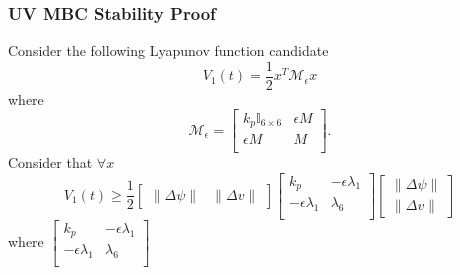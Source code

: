 \subsubsection{\acs{UV} \acs{MBC} Stability Proof}\label{chUV_AMBC.sec.proof_MBC}

Consider the following Lyapunov function candidate
%
\begin{equation} \label{chUV_AMBC.eq.lyap}
V_1(t)=\frac{1}{2} x^T\mathcal{M}_\epsilon x
\end{equation}
%
where 
%
\begin{equation}\label{chUV_AMBC.eq.lyapM}
\mathcal{M}_\epsilon=\left[ 
\begin{array}{cc}
  k_p\mathbb{I}_{6\times 6}  & \epsilon M         \\
  \epsilon M               &    M               \\
\end{array} \right].
\end{equation}
%
Consider that $\forall x$
%
\begin{equation} \label{chUV_AMBC.eq.lyap_bound}
V_1(t)\geq\frac{1}{2}\left[\begin{array}{cc}
   \|\Delta \psi\| & \|\Delta v\|
   \end{array} \right] 
  \left[\begin{array}{cc}
       k_p             & -\epsilon \lambda_1  \\
  -\epsilon \lambda_1  &  \lambda_6           \\
  \end{array} \right] 
\left[\begin{array}{c}
   \|\Delta \psi\| \\ \|\Delta v\|
   \end{array} \right]
\end{equation}
%
%
where 
%
 $  \left[\begin{array}{cc}
       k_p             & -\epsilon \lambda_1  \\
  -\epsilon \lambda_1  &  \lambda_6           \\
  \end{array} \right]$  

